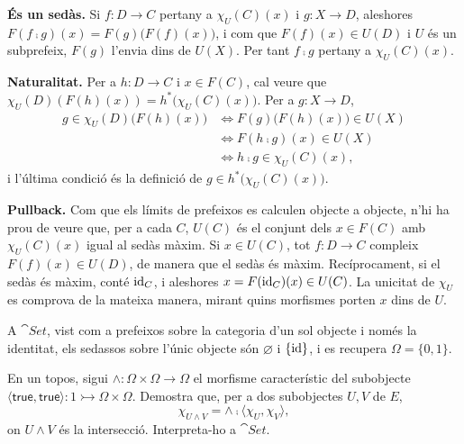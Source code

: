 \begin{solucio}
\textbf{És un sedàs.} Si $f\colon D\to C$ pertany a $\chi_U(C)(x)$ i $g\colon X\to D$, aleshores $F(f\comp g)(x)=F(g)\bigl(F(f)(x)\bigr)$, i com que $F(f)(x)\in U(D)$ i $U$ és un subprefeix, $F(g)$ l'envia dins de $U(X)$. Per tant $f\comp g$ pertany a $\chi_U(C)(x)$.

\textbf{Naturalitat.} Per a $h\colon D\to C$ i $x\in F(C)$, cal veure que $\chi_U(D)(F(h)(x))=h^{*}\bigl(\chi_U(C)(x)\bigr)$. Per a $g\colon X\to D$,
\[
\begin{aligned}
g\in\chi_U(D)\bigl(F(h)(x)\bigr)
&\iff F(g)\bigl(F(h)(x)\bigr)\in U(X)\\
&\iff F(h\comp g)(x)\in U(X)\\
&\iff h\comp g\in\chi_U(C)(x),
\end{aligned}
\]
i l'última condició és la definició de $g\in h^{*}\bigl(\chi_U(C)(x)\bigr)$.

\textbf{Pullback.} Com que els límits de prefeixos es calculen objecte a objecte, n'hi ha prou de veure que, per a cada $C$, $U(C)$ és el conjunt dels $x\in F(C)$ amb $\chi_U(C)(x)$ igual al sedàs màxim. Si $x\in U(C)$, tot $f\colon D\to C$ compleix $F(f)(x)\in U(D)$, de manera que el sedàs és màxim. Recíprocament, si el sedàs és màxim, conté $\operatorname{id}_C$, i aleshores $x=F(\operatorname{id}_C)(x)\in U(C)$. La unicitat de $\chi_U$ es comprova de la mateixa manera, mirant quins morfismes porten $x$ dins de $U$.

A $\cat{Set}$, vist com a prefeixos sobre la categoria d'un sol objecte i només la identitat, els sedassos sobre l'únic objecte són $\varnothing$ i $\{\operatorname{id}\}$, i es recupera $\Omega=\{0,1\}$.
\end{solucio}

\begin{exercici}\label{pr-conjuncio-omega}
En un topos, sigui $\wedge\colon\Omega\times\Omega\to\Omega$ el morfisme característic del subobjecte $\langle\mathsf{true},\mathsf{true}\rangle\colon 1\rightarrowtail\Omega\times\Omega$. Demostra que, per a dos subobjectes $U,V$ de $E$,
\[
\chi_{U\wedge V}=\wedge\comp\langle\chi_U,\chi_V\rangle,
\]
on $U\wedge V$ és la intersecció. Interpreta-ho a $\cat{Set}$.
\end{exercici}


